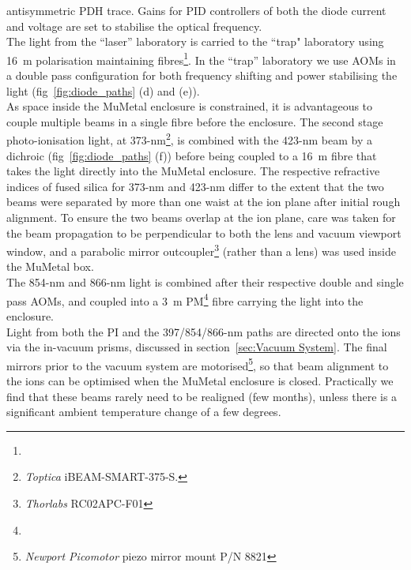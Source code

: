     antisymmetric PDH trace. Gains for PID controllers of both the diode current
    and voltage are set to stabilise the optical frequency.\\
    The light from
    the ``laser'' laboratory is carried to the ``trap" laboratory using 16~m
    polarisation maintaining fibres\footnote{}. In
    the ``trap'' laboratory we use AOMs in a double pass configuration for both
    frequency shifting and power stabilising the light
    (fig~\ref{fig:diode_paths} (d) and (e)). \\
    As space inside the MuMetal enclosure is constrained, it is advantageous to
    couple multiple beams in a single fibre before the enclosure.
    The second stage photo-ionisation light, at 373-nm\footnote{\emph{Toptica} iBEAM-SMART-375-S.},
    is combined with the 423-nm beam by a dichroic
    (fig~\ref{fig:diode_paths} (f)) before being coupled to a 16~m fibre that
    takes the light directly into the MuMetal enclosure. The respective refractive indices of fused silica  for 373-nm and 423-nm differ to the extent that the two beams were separated by more than one waist at the ion plane after initial rough alignment. To ensure the two beams overlap at the ion plane, care was taken for the beam propagation to be perpendicular to both the lens and vacuum viewport window, and a parabolic mirror outcoupler\footnote{\emph{Thorlabs} RC02APC-F01} (rather than a lens) was used inside the MuMetal box.\\
    The 854-nm and 866-nm light is combined after
    their respective double and single pass AOMs, and coupled into a 3~m PM\footnote{}
    fibre carrying the light into the enclosure.\\
    Light from both the PI and the 397/854/866-nm paths are directed onto the
    ions via the in-vacuum prisms, discussed in section~\ref{sec:Vacuum System}.
    The final mirrors prior to the vacuum system are
    motorised\footnote{\emph{Newport Picomotor} piezo mirror mount P/N 8821}, so that beam alignment to the ions
    can be optimised when the MuMetal enclosure is closed. Practically we find
    that these beams rarely need to be realigned (few months), unless there is a
    significant ambient temperature change of a few degrees.\\


